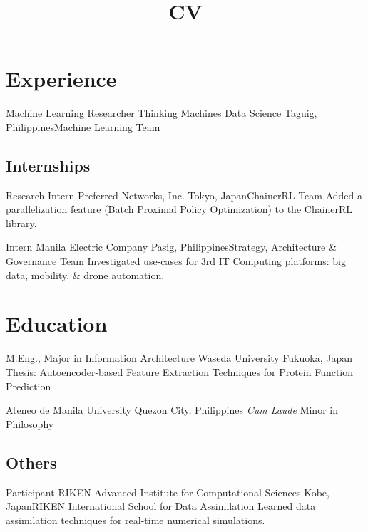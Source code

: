 \documentclass[11pt,a4paper,sans]{moderncv}
\title{CV}
\begin{document}
\maketitle

\section{Experience}
        {Machine Learning Researcher}
        {Thinking Machines Data Science}
        {Taguig, Philippines}{Machine Learning Team}
        {
        }

\subsection{Internships}

        {Research Intern}
        {Preferred Networks, Inc.}
        {Tokyo, Japan}{ChainerRL Team}
        {Added a parallelization feature (Batch Proximal Policy Optimization) to the ChainerRL library.}

        {Intern}
        {Manila Electric Company}
        {Pasig, Philippines}{Strategy, Architecture \& Governance Team}
        {Investigated use-cases for 3rd IT Computing platforms: big data,
        mobility, \& drone automation.}


\section{Education}
        {M.Eng., Major in Information Architecture}
        {Waseda University}
        {Fukuoka, Japan}{}
        {Thesis: Autoencoder-based Feature Extraction Techniques for Protein
        Function Prediction}

        {Ateneo de Manila University}
        {Quezon City, Philippines}
        {\textit{Cum Laude}}
        {Minor in Philosophy}


\subsection{Others}

        {Participant}
        {RIKEN-Advanced Institute for Computational Sciences}
        {Kobe, Japan}{RIKEN International School for Data Assimilation}
        {Learned data assimilation techniques for real-time numerical simulations.}
\end{document}
